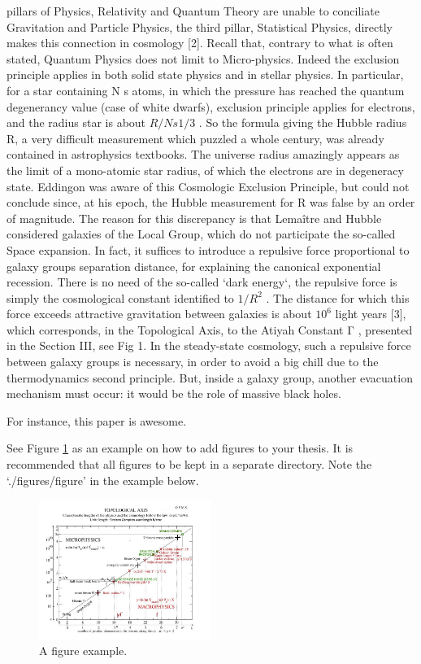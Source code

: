 pillars of Physics, Relativity and Quantum Theory are unable to conciliate Gravitation and Particle
Physics, the third pillar, Statistical Physics, directly makes this connection in cosmology [2].
Recall that, contrary to what is often stated, Quantum Physics does not limit to Micro-physics.
Indeed the exclusion principle applies in both solid state physics and in stellar physics. In particular,
for a star containing N s atoms, in which the pressure has reached the quantum degenerancy value
(case of white dwarfs), exclusion principle applies for electrons, and the radius star is about $R/N s1/3$ .
So the formula giving the Hubble radius R, a very difficult measurement which puzzled a whole
century, was already contained in astrophysics textbooks. The universe radius amazingly appears as
the limit of a mono-atomic star radius, of which the electrons are in degeneracy state. Eddingon was
aware of this Cosmologic Exclusion Principle, but could not conclude since, at his epoch, the
Hubble measurement for R was false by an order of magnitude.
The reason for this discrepancy is that Lemaître and Hubble considered galaxies of the Local
Group, which do not participate the so-called Space expansion. In fact, it suffices to introduce a
repulsive force proportional to galaxy groups separation distance, for explaining the canonical
exponential recession. There is no need of the so-called `dark energy`, the repulsive force is simply
the cosmological constant identified to $1/R^{2}$ . The distance for which this force exceeds attractive
gravitation between galaxies is about $10^{6}$ light years [3], which corresponds, in the Topological
Axis, to the Atiyah Constant Γ , presented in the Section III, see Fig 1.
In the steady-state cosmology, such a repulsive force between galaxy groups is necessary, in
order to avoid a big chill due to the thermodynamics second principle. But, inside a galaxy group,
another evacuation mechanism must occur: it would be the role of massive black holes.

For instance, this paper \cite{fm1} is awesome.

See Figure \ref{fig:figure_label} as an example on how to add figures to your thesis.
It is recommended that all figures to be kept in a separate directory.
Note the `./figures/figure' in the example below.


\begin{figure}
\centering
\includegraphics[width=0.5\textwidth]{./figures/figure}
\caption{A figure example.}
\label{fig:figure_label}
\end{figure}


